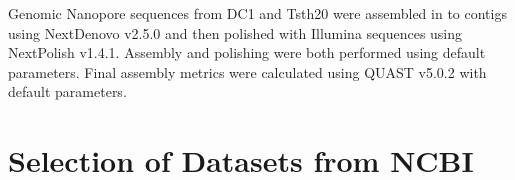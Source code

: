 Genomic Nanopore sequences from DC1 and Tsth20 were assembled in to
contigs using NextDenovo\cite{Hu2024} v2.5.0 and then polished with
Illumina sequences using NextPolish\cite{Hu2020} v1.4.1. Assembly and
polishing were both performed using default parameters. Final assembly
metrics were calculated using QUAST v5.0.2\cite{Gurevich2013} with
default parameters.






\section{Selection of Datasets from NCBI}
\label{met:datasets}

